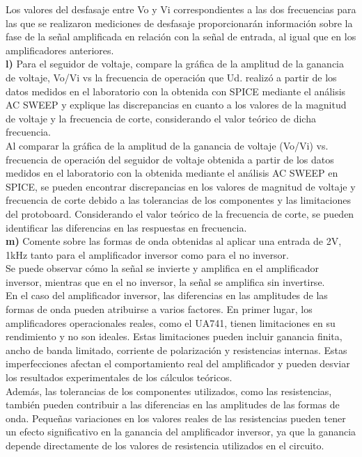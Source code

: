 \documentclass[12pt]{article}
\begin{document}
	Los valores del desfasaje entre Vo y Vi correspondientes a las dos frecuencias para las que se realizaron mediciones de desfasaje proporcionarán información sobre la fase de la señal amplificada en relación con la señal de entrada, al igual que en los amplificadores anteriores.\\
	
	\noindent \textbf{l)} Para el seguidor de voltaje, compare la gráfica de la amplitud de la ganancia de voltaje,	Vo/Vi vs la frecuencia de operación que Ud. realizó a partir de los datos medidos en el laboratorio con la obtenida con SPICE mediante el análisis AC SWEEP y explique las discrepancias en cuanto a los valores de la magnitud de voltaje y la frecuencia de corte, considerando el valor teórico de dicha frecuencia.\\
	
	Al comparar la gráfica de la amplitud de la ganancia de voltaje (Vo/Vi) vs. frecuencia de operación del seguidor de voltaje obtenida a partir de los datos medidos en el laboratorio con la obtenida mediante el análisis AC SWEEP en SPICE, se pueden encontrar discrepancias en los valores de magnitud de voltaje y frecuencia de corte debido a las tolerancias de los componentes y las limitaciones del protoboard. Considerando el valor teórico de la frecuencia de corte, se pueden identificar las diferencias en las respuestas en frecuencia.\\
	
	\noindent \textbf{m)} Comente sobre las formas de onda obtenidas al aplicar una entrada de 2V, 1kHz tanto para el amplificador inversor como para el no inversor.\\
	
	Se puede observar cómo la señal se invierte y amplifica en el amplificador inversor, mientras que en el no inversor, la señal se amplifica sin invertirse.\\
	
	En el caso del amplificador inversor, las diferencias en las amplitudes de las formas de onda pueden atribuirse a varios factores. En primer lugar, los amplificadores operacionales reales, como el UA741, tienen limitaciones en su rendimiento y no son ideales. Estas limitaciones pueden incluir ganancia finita, ancho de banda limitado, corriente de polarización y resistencias internas. Estas imperfecciones afectan el comportamiento real del amplificador y pueden desviar los resultados experimentales de los cálculos teóricos.\\
	
	Además, las tolerancias de los componentes utilizados, como las resistencias, también pueden contribuir a las diferencias en las amplitudes de las formas de onda. Pequeñas variaciones en los valores reales de las resistencias pueden tener un efecto significativo en la ganancia del amplificador inversor, ya que la ganancia depende directamente de los valores de resistencia utilizados en el circuito.\\
	
\end{document}
